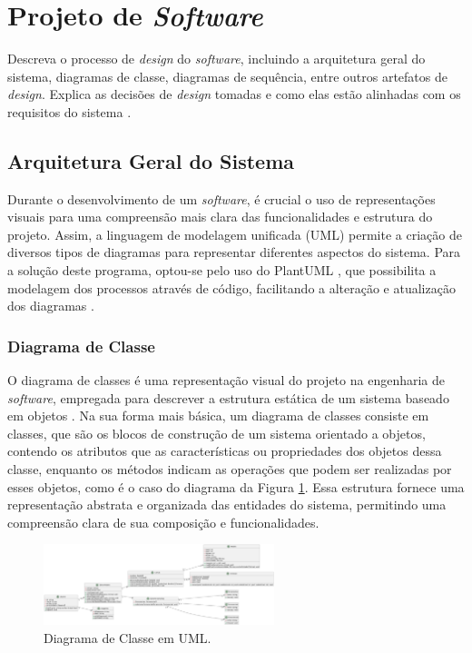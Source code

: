 \section{Projeto de \textit{Software}}

Descreva o processo de \textit{design} do \textit{software}, incluindo a arquitetura geral do sistema, diagramas de classe, diagramas de sequência, entre outros artefatos de \textit{design}. Explica as decisões de \textit{design} tomadas e como elas estão alinhadas com os requisitos do sistema \cite{softwareeng}.

\subsection{Arquitetura Geral do Sistema}

Durante o desenvolvimento de um \textit{software}, é crucial o uso de representações visuais para uma compreensão mais clara das funcionalidades e estrutura do projeto. Assim, a linguagem de modelagem unificada (UML) permite a criação de diversos tipos de diagramas para representar diferentes aspectos do sistema. Para a solução deste programa, optou-se pelo uso do PlantUML \cite{plantumldoc}, que possibilita a modelagem dos processos através de código, facilitando a alteração e atualização dos diagramas \cite{softwareengreq}.

\subsubsection{Diagrama de Classe}

O diagrama de classes é uma representação visual do projeto na engenharia de \textit{software}, empregada para descrever a estrutura estática de um sistema baseado em objetos \cite{softwareenguml}. Na sua forma mais básica, um diagrama de classes consiste em classes, que são os blocos de construção de um sistema orientado a objetos, contendo os atributos que as características ou propriedades dos objetos dessa classe, enquanto os métodos indicam as operações que podem ser realizadas por esses objetos, como é o caso do diagrama da Figura \ref{fig:ClassDiagram}. Essa estrutura fornece uma representação abstrata e organizada das entidades do sistema, permitindo uma compreensão clara de sua composição e funcionalidades.
            
\begin{figure}[htb]
    \caption{\label{fig:ClassDiagram}Diagrama de Classe em UML.}
    \begin{center}
        \includegraphics[width=0.6\textwidth]{figuras/ClassDiagram.png}
    \end{center}
\end{figure}
            
